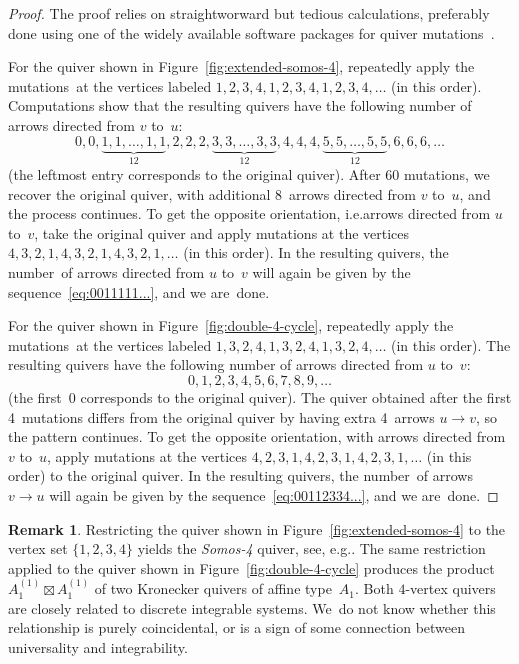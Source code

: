 \documentclass[10pt]{amsart}
\theoremstyle{definition}
\newtheorem{remark}[theorem]{Remark}
\newcommand{\ie}{i.e.}
\newcommand{\eg}{e.g.}
\begin{document}
\begin{proof}
The proof relies on straightworward but tedious calculations, preferably done using one of the widely available software packages for quiver mutations~\cite{keller-applet, musiker-stump}. 

For the quiver shown in Figure~\ref{fig:extended-somos-4}, repeatedly apply the mutations~at the vertices labeled $1,2,3,4,1,2,3,4,1,2,3,4,\dots$
(in this order). Computations show that the resulting quivers have the following number of arrows directed from $v$ to~$u$:
\begin{equation}
\label{eq:0011111...}
0, 0, \underbrace{1,1,\dots,1,1}_{12},2,2,2,\underbrace{3,3,\dots,3,3}_{12},4,4,4,\underbrace{5,5,\dots,5,5}_{12},6,6,6,\dots
\end{equation}
(the leftmost entry corresponds to the original quiver). 
After 60 mutations, we recover the original quiver, with additional 8~arrows directed from $v$ to~$u$, and the process continues. To get the opposite orientation, \ie arrows directed from $u$ to~$v$, take the original quiver and apply mutations at the vertices $4,3,2,1,4,3,2,1,4,3,2,1,\dots$ (in this order). 
In the resulting quivers, the number~of arrows directed from $u$ to~$v$ will again be given by the sequence~\eqref{eq:0011111...}, and we are~done. 

For the quiver shown in Figure~\ref{fig:double-4-cycle}, repeatedly apply the mutations~at the vertices labeled $1,3,2,4,1,3,2,4,1,3,2,4,\dots$ (in this order). The resulting quivers have the following number of arrows directed from $u$ to~$v$:
\begin{equation}
\label{eq:00112334...}
0,1,2,3,4,5,6,7,8,9,\dots
\end{equation}
(the first~0 corresponds to the original quiver). 
The quiver obtained after the first 4~mutations differs from the original quiver by having extra 4~arrows $u\!\longrightarrow \!v$, so the pattern continues. To get the opposite orientation, with arrows directed from $v$ to~$u$, apply mutations at the vertices $4,2,3,1,4,2,3,1,4,2,3,1,\dots$ (in this order) to the original quiver. 
In the resulting quivers, the number~of arrows $v\!\longrightarrow \!u$ will again be given by the sequence~\eqref{eq:00112334...}, and we are~done. 
\end{proof}


\begin{remark}
Restricting the quiver shown in Figure~\ref{fig:extended-somos-4} to the vertex set $\{1,2,3,4\}$ yields the \emph{Somos-4} quiver, see, \eg \cite[Section~7.1]{marsh-lectures}. 
The same restriction applied to the quiver shown in Figure~\ref{fig:double-4-cycle} produces the product $A_1^{(1)}\boxtimes A_1^{(1)}$ of two Kronecker quivers of affine type~$A_1$. Both $4$-vertex quivers are closely related to discrete integrable systems. We~do not know whether this relationship is purely coincidental, or is a sign of some connection between universality and integrability. 
\end{remark}
\end{document}
